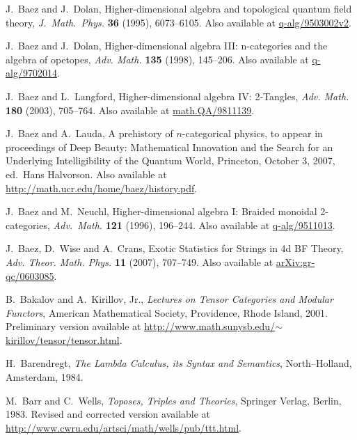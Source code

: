 \documentclass[12pt,twoside,openright]{report}
\begin{document}
\begin{thebibliography}{99}
 J.\ Baez and J.\ Dolan, Higher-dimensional algebra and topological quantum field theory, \emph{J.\ Math.\ Phys.} \textbf{36} (1995), 6073--6105.  Also available at \href{http://arxiv.org/abs/q-alg/9503002v2}{q-alg/9503002v2}.

 J.\ Baez and J.\ Dolan, Higher-dimensional algebra III: n-categories and the algebra of opetopes, \emph{Adv. Math.} \textbf{135} (1998), 145--206.  Also available at \href{http://arxiv.org/abs/q-alg/9702014}{q-alg/9702014}.

 J.\ Baez and L.\ Langford, Higher-dimensional algebra IV: 2-Tangles, \textsl{Adv. Math.} \textbf{180} (2003), 705--764. Also available at \href{http://arxiv.org/abs/math.QA/9811139}{math.QA/9811139}.

 J.\ Baez and A.\ Lauda, A prehistory of $n$-categorical physics, to appear in proceedings of Deep Beauty: Mathematical Innovation and the Search for an Underlying Intelligibility of the Quantum World, Princeton, October 3, 2007, ed.\ Hans Halvorson. Also available at \href{http://math.ucr.edu/home/baez/history.pdf}
{http://math.ucr.edu/home/baez/history.pdf}.

 J.\ Baez and M.\ Neuchl, Higher-dimensional algebra I: Braided monoidal 2-categories, \textsl{Adv.\ Math.} \textbf{121} (1996), 196--244. Also available at \href{http://arxiv.org/abs/q-alg/9511013}{q-alg/9511013}.

J.\ Baez, D.\ Wise and A.\ Crans, Exotic Statistics for Strings in 4d BF Theory, \textsl{Adv. Theor. Math. Phys.} \textbf{11} (2007), 707--749.  Also available at \href{http://arxiv.org/abs/gr-qc/0603085}{arXiv:gr-qc/0603085}.

 B.\ Bakalov and A.\ Kirillov, Jr., {\sl Lectures on Tensor Categories and Modular Functors}, American Mathematical Society, Providence, Rhode Island, 2001.  Preliminary version available at \href{http://www.math.sunysb.edu/~kirillov/tensor/tensor.html}{http://www.math.sunysb.edu/$\sim$kirillov/tensor/tensor.html}.

 H.\ Barendregt, {\sl The Lambda Calculus, its Syntax and Semantics}, North--Holland, Amsterdam, 1984.

 M.\ Barr and C.\ Wells, {\sl Toposes, Triples and Theories}, Springer Verlag, Berlin, 1983.  Revised and corrected version available at \href{http://www.cwru.edu/artsci/math/wells/pub/ttt.html}{
http://www.cwru.edu/artsci/math/wells/pub/ttt.html}.


\end{thebibliography}
\end{document}

